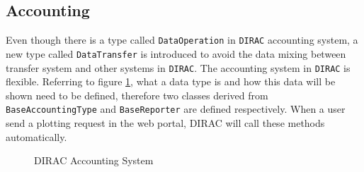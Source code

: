 \subsection{Accounting}

Even though there is a type called {\tt DataOperation} in {\tt DIRAC}
accounting system, a new type called {\tt DataTransfer}
is introduced to avoid the data mixing between transfer system
and other systems in {\tt DIRAC}.
The accounting system 
in {\tt DIRAC} is flexible. Referring to figure \ref{fig:acct},
what a data type is and how this data will be shown
need to be defined,
therefore two classes derived from {\tt BaseAccountingType}
and {\tt BaseReporter} are defined respectively.
When a user send a plotting request in the web portal, 
DIRAC will call these methods automatically.
\begin{figure}[htbp]
    
    \caption{\label{fig:acct}DIRAC Accounting System}
\end{figure}
